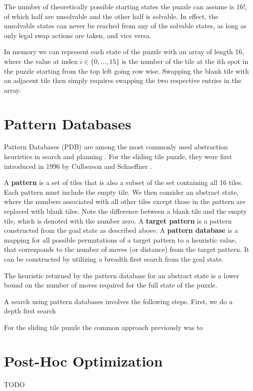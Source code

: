 The number of theoretically possible starting states the puzzle can assume is 16!, of which half are unsolvable and the other half is solvable. In effect, the unsolvable states can never be reached from any of the solvable states, as long as only legal swap actions are taken, and vice versa. 

In memory we can represent each state of the puzzle with an array of length 16, where the value at index $i \in \{0, ..., 15\}$ is the number of the tile at the ith spot in the puzzle starting from the top left going row wise. Swapping the blank tile with an adjacent tile then simply requires swapping the two respective entries in the array.

\section{Pattern Databases} 

Pattern Databases (PDB) are among the most commonly used abstraction heuristics in search and planning \cite{helmert:pdb}. For the sliding tile puzzle, they were first introduced in 1996 by Culberson and Schaeffner \cite{culberson:pdb} \cite{culberson:swpdb}.

A \textbf{pattern} is a set of tiles that is also a subset of the set containing all 16 tiles. Each pattern must include the empty tile. We then consider an abstract state, where the numbers associated with all other tiles except those in the pattern are replaced with blank tiles. Note the difference between a blank tile and the empty tile, which is denoted with the number zero.
A \textbf{target pattern} is a pattern constructed from the goal state as described above.
A \textbf{pattern database} is a mapping for all possible permutations of a target pattern to a heuristic value, that corresponds to the number of moves (or distance) from the target pattern. It can be constructed by utilizing a breadth first search from the goal state.

The heuristic returned by the pattern database for an abstract state is a lower bound on the number of moves required for the full state of the puzzle. \cite{culberson:pdb}




A search using pattern databases involves the following steps. First, we do a depth first search \cite{sturtevant:sas}

For the sliding tile puzzle the common approach previously was to 

\section{Post-Hoc Optimization}

TODO


